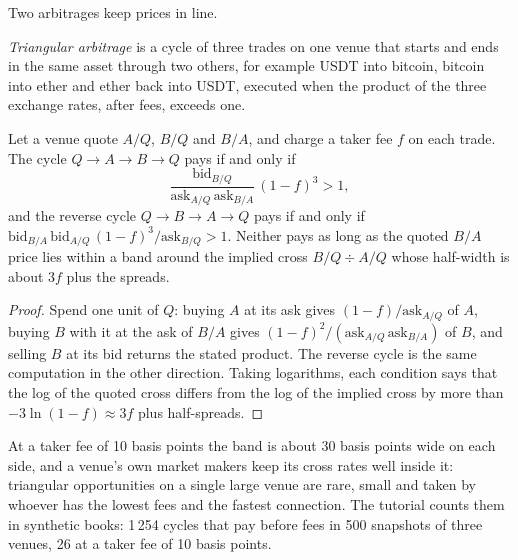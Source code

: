 Two arbitrages keep prices in line.

\begin{definition}\label{def:m3:spot-markets:tri}
\emph{Triangular arbitrage} is a cycle of three trades on one venue that
starts and ends in the same asset through two others, for example USDT into bitcoin, bitcoin into ether and
ether back into USDT, executed when the product of the three exchange rates, after fees, exceeds one.
\end{definition}

\begin{proposition}\label{prop:m3:spot-markets:band}
Let a venue quote $A/Q$, $B/Q$ and $B/A$, and charge a taker fee $f$ on each trade. The cycle
$Q \to A \to B \to Q$ pays if and only if
\[
\frac{\text{bid}_{B/Q}}{\text{ask}_{A/Q}\,\text{ask}_{B/A}}\,(1 - f)^3 > 1,
\]
and the reverse cycle $Q \to B \to A \to Q$ pays if and only if
$\text{bid}_{B/A}\,\text{bid}_{A/Q}\,(1 - f)^3 / \text{ask}_{B/Q} > 1$. Neither pays as long as the quoted
$B/A$ price lies within a band around the implied cross $B/Q \div A/Q$ whose half-width is about $3f$
plus the spreads.
\end{proposition}

\begin{proof}
Spend one unit of $Q$: buying $A$ at its ask gives $(1-f)/\text{ask}_{A/Q}$ of $A$, buying $B$ with it at the
ask of $B/A$ gives $(1-f)^2/(\text{ask}_{A/Q}\,\text{ask}_{B/A})$ of $B$, and selling $B$ at its bid returns the
stated product. The reverse cycle is the same computation in the other direction. Taking logarithms, each
condition says that the log of the quoted cross differs from the log of the implied cross by more than
$-3\ln(1-f) \approx 3f$ plus half-spreads.
\end{proof}

At a taker fee of 10 basis points the band is about 30 basis points wide on each side, and a venue's own
market makers keep its cross rates well inside it: triangular opportunities on a single large venue are
rare, small and taken by whoever has the lowest fees and the fastest connection. The tutorial counts them
in synthetic books: 1\,254 cycles that pay before fees in 500 snapshots of three venues, 26 at a taker fee
of 10 basis points.

